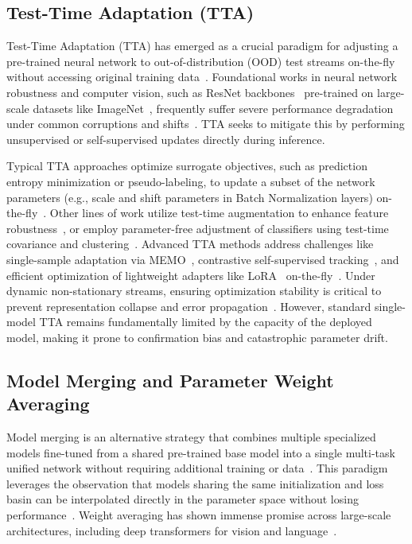 \documentclass{article}
\theoremstyle{plain}
\theoremstyle{definition}
\theoremstyle{remark}
\begin{document}
\subsection{Test-Time Adaptation (TTA)}
Test-Time Adaptation (TTA) has emerged as a crucial paradigm for adjusting a pre-trained neural network to out-of-distribution (OOD) test streams on-the-fly without accessing original training data~\citep{wang2021tent}. Foundational works in neural network robustness and computer vision, such as ResNet backbones~\citep{he2016deep} pre-trained on large-scale datasets like ImageNet~\citep{deng2009imagenet,krizhevsky2012imagenet}, frequently suffer severe performance degradation under common corruptions and shifts~\citep{hendrycks2019benchmarking}. TTA seeks to mitigate this by performing unsupervised or self-supervised updates directly during inference.

Typical TTA approaches optimize surrogate objectives, such as prediction entropy minimization or pseudo-labeling, to update a subset of the network parameters (e.g., scale and shift parameters in Batch Normalization layers) on-the-fly~\citep{wang2021tent,nado2020evaluating}. Other lines of work utilize test-time augmentation to enhance feature robustness~\citep{liang2022source}, or employ parameter-free adjustment of classifiers using test-time covariance and clustering~\citep{iwasawa2021test,boudiaf2022parameter}. Advanced TTA methods address challenges like single-sample adaptation via MEMO~\citep{zhang2022memo}, contrastive self-supervised tracking~\citep{chen2022contrastive}, and efficient optimization of lightweight adapters like LoRA~\citep{hu2021lora} on-the-fly~\citep{sun2020test}. Under dynamic non-stationary streams, ensuring optimization stability is critical to prevent representation collapse and error propagation~\citep{niu2022efficient,niu2023towards,goyal2022test}. However, standard single-model TTA remains fundamentally limited by the capacity of the deployed model, making it prone to confirmation bias and catastrophic parameter drift.

\subsection{Model Merging and Parameter Weight Averaging}
Model merging is an alternative strategy that combines multiple specialized models fine-tuned from a shared pre-trained base model into a single multi-task unified network without requiring additional training or data~\citep{wortsman2022model,neyshabur2020what}. This paradigm leverages the observation that models sharing the same initialization and loss basin can be interpolated directly in the parameter space without losing performance~\citep{frankle2018lottery,choshen2022fusing}. Weight averaging has shown immense promise across large-scale architectures, including deep transformers for vision and language~\citep{vaswani2017attention,devlin2018bert,radford2019language,brown2020language}.
\end{document}
